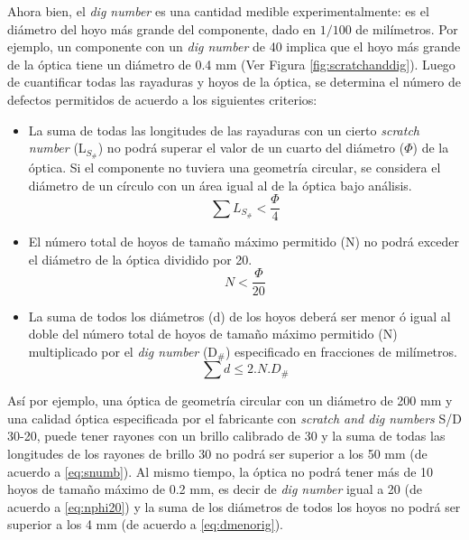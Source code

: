 Ahora bien, el \textit{dig number} es una cantidad medible experimentalmente: es el diámetro del hoyo más grande del componente, dado en $1/100$ de milímetros. Por ejemplo, un componente con un \textit{dig number} de 40 implica que el hoyo más grande de la óptica tiene un diámetro de 0.4 mm (Ver Figura \ref{fig:scratchanddig}). Luego de cuantificar todas las rayaduras y hoyos de la óptica, se determina el número de defectos permitidos de acuerdo a los siguientes criterios:
\begin{itemize}
\item La suma de todas las longitudes de las rayaduras con un cierto \textit{scratch number} (L$_{S_{\#}}$) no podrá superar el valor de un cuarto del diámetro ($\Phi$) de la óptica. Si el componente no tuviera una geometría circular, se considera el diámetro de un círculo con un área igual al de la óptica bajo análisis.
\begin{equation}
\sum L_{S_{\#}} < \frac{\Phi}{4}
\label{eq:snumb}
\end{equation}
\item El número total de hoyos de tamaño máximo permitido (N) no podrá exceder el diámetro de la óptica dividido por 20.
\begin{equation}
N  <  \frac{\Phi}{20}
\label{eq:nphi20}
\end{equation}
\item La suma de todos los diámetros (d) de los hoyos deberá ser menor ó igual al doble del número total de hoyos de tamaño máximo permitido (N) multiplicado por el \textit{dig number} (D$_{\#}$) especificado en fracciones de milímetros.
\begin{equation}
\sum d 	\leq 2 . N . D_{\#}
\label{eq:dmenorig}
\end{equation}
\end{itemize}

Así por ejemplo, una óptica de geometría circular con un diámetro de 200 mm y una calidad óptica especificada por el fabricante con \textit{scratch and dig numbers} S/D 30-20, puede tener rayones con un brillo calibrado de 30 y la suma de todas las longitudes de los rayones de brillo 30 no podrá ser superior a los 50 mm (de acuerdo a \eqref{eq:snumb}). Al mismo tiempo, la óptica no podrá tener más de 10 hoyos de tamaño máximo de 0.2 mm, es decir de \textit{dig number} igual a 20 (de acuerdo a  \eqref{eq:nphi20}) y la suma de los diámetros de todos los hoyos no podrá ser superior a los 4 mm (de acuerdo a \eqref{eq:dmenorig}).

